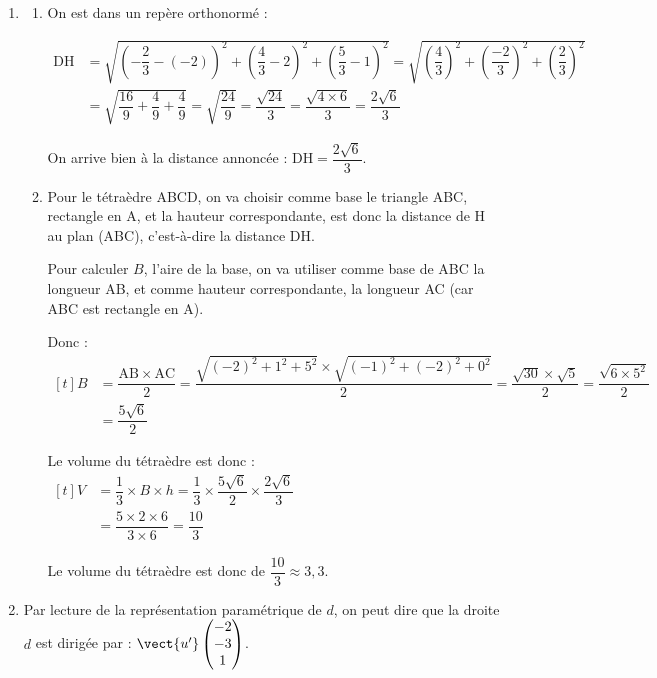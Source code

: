 \begin{enumerate}
	\item 
		\begin{enumerate}
		\item On est dans un repère orthonormé :

$\begin{aligned}
	\mathrm{DH} &= \sqrt{\left(-\dfrac{2}{3} - (-2)\right)^2+\left(\dfrac{4}{3} - 2\right)^2+\left(\dfrac{5}{3} - 1\right)^2 } = \sqrt{\left(\dfrac{4}{3}\right)^2+\left(\dfrac{-2}{3}\right)^2+\left(\dfrac{2}{3}\right)^2 } \\
	&= \sqrt{\dfrac{16}{9} + \dfrac{4}{9} + \dfrac{4}{9}} = \sqrt{\dfrac{24}{9}} = \dfrac{\sqrt{24}}{3} = \dfrac{\sqrt{4\times 6}}{3} = \dfrac{2\sqrt{6}}{3}
\end{aligned}$

		On arrive bien à la distance annoncée : \quad $\mathrm{DH} = \dfrac{2\sqrt{6}}{3}$.

		\item Pour le tétraèdre ABCD, on va choisir comme base le triangle ABC, rectangle en A, et la hauteur correspondante, est donc la distance de H au plan (ABC), c'est-à-dire la distance DH.

		Pour calculer $B$, l'aire de la base, on va utiliser comme base de ABC la longueur AB, et comme hauteur correspondante, la longueur AC (car ABC est rectangle en A).

		Donc :\quad $\begin{aligned}[t]
			B &= \dfrac{\mathrm{AB} \times \mathrm{AC}}{2} = \dfrac{\sqrt{(-2)^2 + 1^2 + 5^2}\times \sqrt{(-1)^2 + (-2)^2 + 0^2}}{2} = \dfrac{\sqrt{30}\times \sqrt{5}}{2}= \dfrac{\sqrt{6\times5^2}}{2}\\
			&=\dfrac{5\sqrt{6}}{2}
		\end{aligned}$

		Le volume du tétraèdre est donc :\quad $\begin{aligned}[t]
			V &= \dfrac{1}{3}\times B \times h = \dfrac{1}{3} \times \dfrac{5\sqrt{6}}{2}\times \dfrac{2\sqrt{6}}{3} \\
			&= \dfrac{5\times2\times6}{3\times6} = \dfrac{10}{3}
		\end{aligned}$

		Le volume du tétraèdre est donc de $\dfrac{10}{3} \approx 3,3$.
		\end{enumerate}

	\item Par lecture de la représentation paramétrique de $d$, on peut dire que la droite $d$ est dirigée par : $\vect{u'}\begin{pmatrix} -2 \\ -3 \\ 1\end{pmatrix}$.


\end{enumerate}
